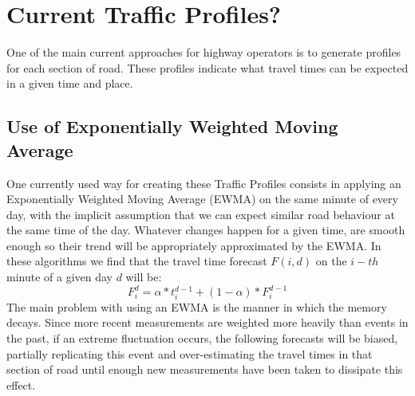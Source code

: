 \documentclass[conference]{IEEEtran}
\begin{document}
\section{Current Traffic Profiles?}
One of the main current approaches for highway operators is to generate profiles for each section of road. 
These profiles indicate what travel times can be expected in a given time and place.

\subsection{Use of Exponentially Weighted Moving Average} \label{ewma}
One currently used way for creating these Traffic Profiles consists in applying an Exponentially Weighted Moving Average (EWMA) on the same minute of every day, with the implicit assumption that we can expect similar road behaviour at the same time of the day. 
Whatever changes happen for a given time, are smooth enough so their trend will be appropriately approximated by the EWMA.
In these algorithms we find that the travel time forecast $F(i,d)$ on the $i-th$ minute of a given day $d$ will be:
\begin{equation}
F^{d}_i = \alpha * t^{d-1}_{i} + (1-\alpha)*F^{d-1}_{i}
\end{equation}
The main problem with using an EWMA is the manner in which the memory decays. 
Since more recent measurements are weighted more heavily than events in the past, if an extreme fluctuation occurs, the following forecasts will be biased, partially replicating this event and over-estimating the travel times in that section of road until enough new measurements have been taken to dissipate this effect.
\end{document}
